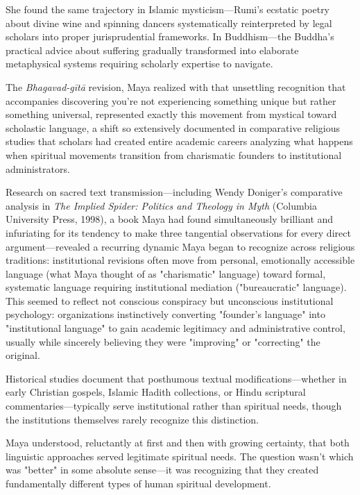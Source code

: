 \documentclass[12pt,twoside]{book}
\begin{document}
She found the same trajectory in Islamic mysticism—Rumi's ecstatic poetry about divine wine and spinning dancers systematically reinterpreted by legal scholars into proper jurisprudential frameworks. In Buddhism—the Buddha's practical advice about suffering gradually transformed into elaborate metaphysical systems requiring scholarly expertise to navigate.

The \emph{Bhagavad-gītā} revision, Maya realized with that unsettling recognition that accompanies discovering you're not experiencing something unique but rather something universal, represented exactly this movement from mystical toward scholastic language, a shift so extensively documented in comparative religious studies that scholars had created entire academic careers analyzing what happens when spiritual movements transition from charismatic founders to institutional administrators.

Research on sacred text transmission—including Wendy Doniger's comparative analysis in \emph{The Implied Spider: Politics and Theology in Myth} (Columbia University Press, 1998), a book Maya had found simultaneously brilliant and infuriating for its tendency to make three tangential observations for every direct argument—revealed a recurring dynamic Maya began to recognize across religious traditions: institutional revisions often move from personal, emotionally accessible language (what Maya thought of as "charismatic" language) toward formal, systematic language requiring institutional mediation ("bureaucratic" language). This seemed to reflect not conscious conspiracy but unconscious institutional psychology: organizations instinctively converting "founder's language" into "institutional language" to gain academic legitimacy and administrative control, usually while sincerely believing they were "improving" or "correcting" the original.

Historical studies document that posthumous textual modifications—whether in early Christian gospels, Islamic Hadith collections, or Hindu scriptural commentaries—typically serve institutional rather than spiritual needs, though the institutions themselves rarely recognize this distinction.

Maya understood, reluctantly at first and then with growing certainty, that both linguistic approaches served legitimate spiritual needs. The question wasn't which was "better" in some absolute sense—it was recognizing that they created fundamentally different types of human spiritual development.
\end{document}
